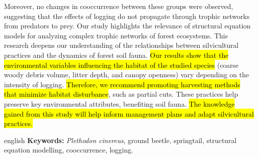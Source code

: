 Moreover, no changes in cooccurrence between these groups were observed, suggesting that the effects of logging do not propagate through trophic networks from predators to prey. 
Our study highlights the relevance of structural equation models for analyzing complex trophic networks of forest ecosystems. 
This research deepens our understanding of the relationships between silvicultural practices and the dynamics of forest soil fauna. 
\hl{Our results show that the environmental variables influencing the habitat of the studied species} (coarse woody debris volume, litter depth, and canopy openness) vary depending on the intensity of logging. 
\hl{Therefore, we recommend promoting harvesting methods that minimize habitat disturbance}, such as partial cuts. 
These practices help preserve key environmental attributes, benefiting soil fauna. 
\hl{The knowledge gained from this study will help inform management plans and adapt silvicultural practices.}

\begin{otherlanguage*}{english}
  \textbf{Keywords:} \textit{Plethodon cinereus}, ground beetle, springtail, structural equation modelling, cooccurrence, logging.
  
\end{otherlanguage*}
